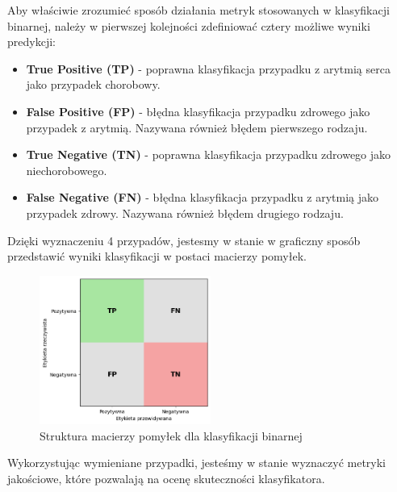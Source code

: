 \documentclass[a4paper,twoside,12pt]{book}
\begin{document}
Aby właściwie zrozumieć sposób działania metryk stosowanych w klasyfikacji binarnej, należy w pierwszej kolejności zdefiniować cztery możliwe wyniki predykcji:
\begin{itemize}
	\item \textbf{True Positive (TP)} - poprawna klasyfikacja przypadku z arytmią serca jako przypadek chorobowy.
	\item \textbf{False Positive (FP)} - błędna klasyfikacja przypadku zdrowego jako przypadek z arytmią. Nazywana również błędem pierwszego rodzaju.
	\item \textbf{True Negative (TN)} - poprawna klasyfikacja przypadku zdrowego jako niechorobowego.
	\item \textbf{False Negative (FN)} - błędna klasyfikacja przypadku z arytmią jako przypadek zdrowy. Nazywana również błędem drugiego rodzaju.
\end{itemize}
Dzięki wyznaczeniu 4 przypadów, jestesmy w stanie w graficzny sposób przedstawić wyniki klasyfikacji w postaci macierzy pomyłek.

\begin{figure}[!h]
	\centering
	\includegraphics[width=0.5\textwidth]{img/r3/error_matrix.png}
	\caption{Struktura macierzy pomyłek dla klasyfikacji binarnej}
	\label{fig:etykieta-rysunku}
\end{figure}

Wykorzystując wymieniane przypadki, jesteśmy w stanie wyznaczyć metryki jakościowe, które pozwalają na ocenę skuteczności klasyfikatora.
\end{document}
